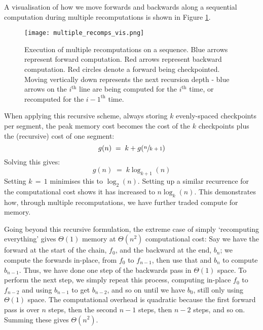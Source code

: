 A visualisation of how we move forwards and backwards along a sequential computation during multiple recomputations is shown in Figure \ref{fig:2-multiple-recomps-vis}.

\begin{figure}[h]
    \centering
    \texttt{[image: multiple\_recomps\_vis.png]}
    \caption{Execution of multiple recomputations on a sequence. Blue arrows represent forward computation. Red arrows represent backward computation. Red circles denote a forward being checkpointed. Moving vertically down represents the next recursion depth - blue arrows on the \(i^{\mathrm{th}}\) line are being computed for the \(i^{\mathrm{th}}\) time, or recomputed for the \({i-1}^{\mathrm{th}}\) time.}
    \label{fig:2-multiple-recomps-vis}
\end{figure}

When applying this recursive scheme, always storing \(k\) evenly-spaced checkpoints per segment, the peak memory cost becomes the cost of the \(k\) checkpoints plus the (recursive) cost of one segment:
\begin{equation*}
    g(n) \;=\; k + g(\sfrac{n}{k+1})
\end{equation*}
Solving this gives:
\begin{equation*}
    g(n) \;=\; k\log_{k+1}(n)
\end{equation*}
Setting \(k\,=\,1\) minimises this to \(\log_2(n)\). 
Setting up a similar recurrence for the computational cost shows it has increased to \(n\log_k(n)\).
This demonstrates how, through multiple recomputations, we have further traded compute for memory.

Going beyond this recursive formulation, the extreme case of simply `recomputing everything' gives \(\Theta(\mathrm{1})\) memory at \(\Theta(n^2)\) computational cost:
Say we have the forward at the start of the chain, \(f_0\), and the backward at the end, \(b_n\);
we compute the forwards in-place, from \(f_0\) to \(f_{n-1}\), then use that and \(b_n\) to compute \(b_{n-1}\).
Thus, we have done one step of the backwards pass in \(\Theta(\mathrm{1})\) space.
To perform the next step, we simply repeat this process, computing in-place \(f_0\) to \(f_{n-2}\) and using \(b_{n-1}\) to get \(b_{n-2}\), and so on until we have \(b_0\), still only using \(\Theta(\mathrm{1})\) space. The computational overhead is quadratic because the first forward pass is over \(n\) steps, then the second \(n-1\) steps, then \(n-2\) steps, and so on. Summing these gives \(\Theta(n^2)\).

